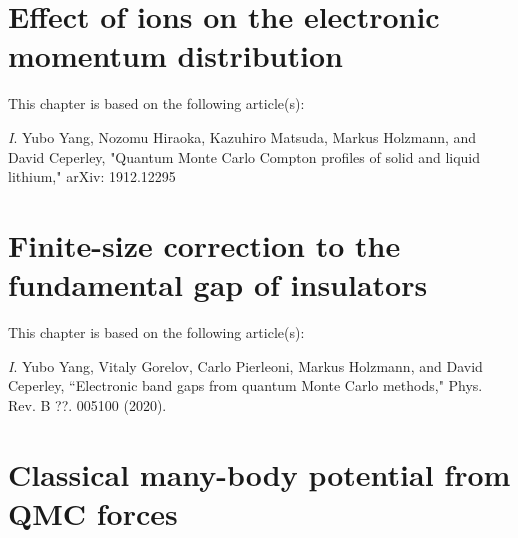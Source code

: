 \documentclass[draftthesis,fullpage]{uiucthesis}
\begin{document}
\chapter{Effect of ions on the electronic momentum distribution}
This chapter is based on the following article(s):

\textit{I}. Yubo Yang, Nozomu Hiraoka, Kazuhiro Matsuda, Markus Holzmann, and David Ceperley, "Quantum Monte Carlo Compton profiles of solid and liquid lithium," arXiv: 1912.12295




\chapter{Finite-size correction to the fundamental gap of insulators}
This chapter is based on the following article(s):

\textit{I}. Yubo Yang, Vitaly Gorelov, Carlo Pierleoni, Markus Holzmann, and David Ceperley, ``Electronic band gaps from quantum Monte Carlo methods," Phys. Rev. B ??. 005100 (2020).



\chapter{Classical many-body potential from QMC forces}
\end{document}
